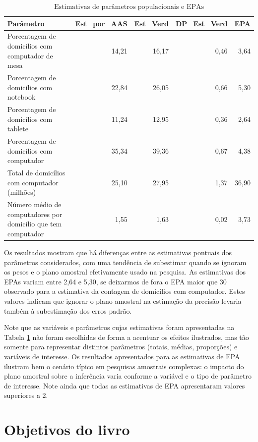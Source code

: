 \documentclass[
  12pt,
  brazilian,
]{book}
\theoremstyle{definition}
\theoremstyle{definition}
\theoremstyle{definition}
\theoremstyle{definition}
\theoremstyle{remark}
\begin{document}
\begin{table}[H]

\caption{\label{tab:tab01c}$\text{Estimativas de parâmetros populacionais e EPAs}$}
\centering
\begin{tabular}[t]{>{\raggedright\arraybackslash}p{7cm}rrrr}
\toprule
Parâmetro & Est\_por\_AAS & Est\_Verd & DP\_Est\_Verd & EPA\\
\midrule
Porcentagem de domicílios com computador de mesa & 14,21 & 16,17 & 0,46 & 3,64\\
Porcentagem de domicílios com notebook & 22,84 & 26,05 & 0,66 & 5,30\\
Porcentagem de domicílios com tablete & 11,24 & 12,95 & 0,36 & 2,64\\
Porcentagem de domicílios com computador & 35,34 & 39,36 & 0,67 & 4,38\\
Total de domicílios com computador (milhões) & 25,10 & 27,95 & 1,37 & 36,90\\
\addlinespace
Número médio de computadores por domicílio que tem computador & 1,55 & 1,63 & 0,02 & 3,73\\
\bottomrule
\end{tabular}
\end{table}

Os resultados mostram que há diferenças entre as estimativas pontuais dos parâmetros considerados, com uma tendência de subestimar quando se ignoram os pesos e o plano amostral efetivamente usado na pesquisa. As estimativas dos EPAs variam entre 2,64 e 5,30, se deixarmos de fora o EPA maior que 30 observado para a estimativa da contagem de domicílios com computador. Estes valores indicam que ignorar o plano amostral na estimação da precisão levaria também à subestimação dos erros padrão.

Note que as variáveis e parâmetros cujas estimativas foram apresentadas na Tabela \ref{tab:tab01c} não foram escolhidas de forma a acentuar os efeitos ilustrados, mas tão somente para representar distintos parâmetros (totais, médias, proporções) e variáveis de interesse. Os resultados apresentados para as estimativas de EPA ilustram bem o cenário típico em pesquisas amostrais complexas: o impacto do plano amostral sobre a inferência varia conforme
a variável e o tipo de parâmetro de interesse. Note ainda que todas as estimativas de EPA apresentaram valores superiores a 2.

\hypertarget{objetivos-do-livro}{%
\section{Objetivos do livro}\label{objetivos-do-livro}}
\end{document}
